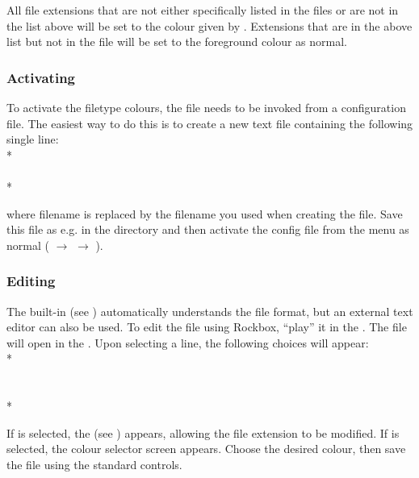 {  All file extensions that are not either specifically listed in the
   files or are not in the list above will be
  set to the colour given by . Extensions that
  are in the above list but not in the 
  file will be set to the foreground colour as normal.

  \subsubsection{Activating}
  To activate the filetype colours, the  file needs to be
  invoked from a  configuration file. The easiest way to do
  this is to create a new text file containing the following single
  line:\\*
  \\
  \\*

  where filename is replaced by the filename you used when creating the
   file. Save this file as e.g.  in the
   directory and then activate the config file
  from the menu as normal
  ( $\rightarrow$ %
  $\rightarrow$ ).

  \subsubsection{Editing}
  The built-in  (see )
  automatically understands the
   file format, but an external text editor can
  also be used. To edit the  file using Rockbox,
  ``play'' it in the . The file will open in
  the . Upon selecting a line, the following choices
  will appear:\\*
  \\
  \\
  \\*

  If  is selected, the 
  (see ) appears,
  allowing the file extension to be modified. If 
  is selected, the colour selector screen appears. Choose the desired
  colour, then save the  file using the standard
   controls.
}

